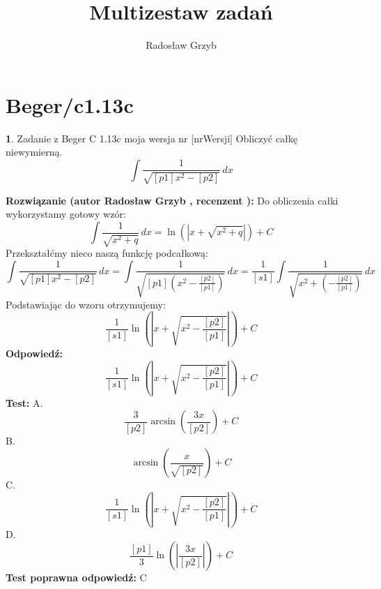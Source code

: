 \documentclass[12pt, a4paper]{article}
\title{Multizestaw zadań}
\author{Radosław Grzyb}
\date{}
\theoremstyle{definition} %
\newtheorem{zad}{}
\newcommand{\kategoria}[1]{\section{#1}} %
\newcommand{\zadStart}[1]{\begin{zad}#1\newline} %
\newcommand{\zadStop}{\end{zad}}   %
\newcommand{\rozwStart}[2]{\noindent \textbf{Rozwiązanie (autor #1 , recenzent #2): }\newline} %
\newcommand{\rozwStop}{\newline}                                            %
\newcommand{\odpStart}{\noindent \textbf{Odpowiedź:}\newline}    %
\newcommand{\odpStop}{\newline}                                             %
\newcommand{\testStart}{\noindent \textbf{Test:}\newline} %
\newcommand{\testStop}{\newline} %
\newcommand{\kluczStart}{\noindent \textbf{Test poprawna odpowiedź:}\newline} %
\newcommand{\kluczStop}{\newline} %
\begin{document}
\maketitle
\kategoria{Beger/c1.13c}
\zadStart{Zadanie z Beger C 1.13c moja wersja nr [nrWersji]}
Obliczyć całkę niewymierną.
$$\int \frac{1}{\sqrt{[p1]x^{2}-[p2]}} \,dx$$
\zadStop
\rozwStart{Radosław Grzyb}{}
Do obliczenia całki wykorzystamy gotowy wzór:
$$\int \frac{1}{\sqrt{x^{2}+q}} \,dx = \ln(|x+\sqrt{x^2+q}|)+C$$
Przekształćmy nieco naszą funkcję podcałkową:
$$\int \frac{1}{\sqrt{[p1]x^{2}-[p2]}} \,dx = \int \frac{1}{\sqrt{[p1](x^{2}-\frac{[p2]}{[p1]})}} \,dx = \frac{1}{[s1]}\int\frac{1}{\sqrt{x^{2}+(-\frac{[p2]}{[p1]})}} \,dx$$
Podstawiając do wzoru otrzymujemy:
$$\frac{1}{[s1]}\ln(|x+\sqrt{x^2-\frac{[p2]}{[p1]}}|)+C$$
\rozwStop
\odpStart
$$\frac{1}{[s1]}\ln(|x+\sqrt{x^2-\frac{[p2]}{[p1]}}|)+C$$
\odpStop
\testStart
A.$$\frac{3}{[p2]}\arcsin(\frac{3x}{[p2]})+C$$
B.$$\arcsin(\frac{x}{\sqrt{[p2]}})+C$$
C.$$\frac{1}{[s1]}\ln(|x+\sqrt{x^2-\frac{[p2]}{[p1]}}|)+C$$
D.$$\frac{[p1]}{3}\ln(|\frac{3x}{[p2]}|)+C$$
\testStop
\kluczStart
C
\kluczStop
\end{document}
